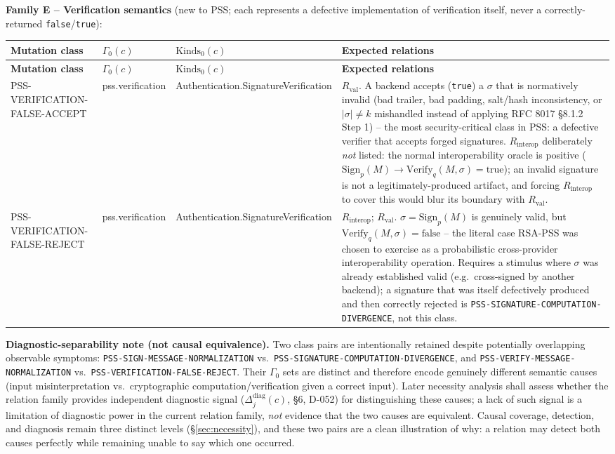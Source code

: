 \documentclass[11pt,a4paper]{article}
\begin{document}
\textbf{Family E -- Verification semantics} (new to PSS; each represents a defective implementation of verification itself, never a correctly-returned \texttt{false}/\texttt{true}):
\begin{longtable}{p{}p{}p{}p{}}
\toprule
\textbf{Mutation class} & \textbf{$\Gamma_0(c)$} & \textbf{$\text{Kinds}_0(c)$} & \textbf{Expected relations}\\
\midrule\endfirsthead
\toprule
\textbf{Mutation class} & \textbf{$\Gamma_0(c)$} & \textbf{$\text{Kinds}_0(c)$} & \textbf{Expected relations}\\
\midrule\endhead
PSS-VERIFICATION-FALSE-ACCEPT & pss.verification & Authentication.SignatureVerification & $R_{\text{val}}$. A backend accepts (\texttt{true}) a $\sigma$ that is normatively invalid (bad trailer, bad padding, salt/hash inconsistency, or $|\sigma|\neq k$ mishandled instead of applying RFC 8017 \S8.1.2 Step 1) -- the most security-critical class in PSS: a defective verifier that accepts forged signatures. $R_{\text{interop}}$ deliberately \emph{not} listed: the normal interoperability oracle is positive ($\text{Sign}_p(M) \to \text{Verify}_q(M,\sigma)=\text{true}$); an invalid signature is not a legitimately-produced artifact, and forcing $R_{\text{interop}}$ to cover this would blur its boundary with $R_{\text{val}}$.\\
PSS-VERIFICATION-FALSE-REJECT & pss.verification & Authentication.SignatureVerification & $R_{\text{interop}}$; $R_{\text{val}}$. $\sigma = \text{Sign}_p(M)$ is genuinely valid, but $\text{Verify}_q(M,\sigma) = \text{false}$ -- the literal case RSA-PSS was chosen to exercise as a probabilistic cross-provider interoperability operation. Requires a stimulus where $\sigma$ was already established valid (e.g.\ cross-signed by another backend); a signature that was itself defectively produced and then correctly rejected is \texttt{PSS-SIGNATURE-COMPUTATION-DIVERGENCE}, not this class.\\
\bottomrule
\end{longtable}

\textbf{Diagnostic-separability note (not causal equivalence).} Two class pairs are intentionally retained despite potentially overlapping observable symptoms: \texttt{PSS-SIGN-MESSAGE-NORMALIZATION} vs.\ \texttt{PSS-SIGNATURE-COMPUTATION-DIVERGENCE}, and \texttt{PSS-VERIFY-MESSAGE-NORMALIZATION} vs.\ \texttt{PSS-VERIFICATION-FALSE-REJECT}. Their $\Gamma_0$ sets are distinct and therefore encode genuinely different semantic causes (input misinterpretation vs.\ cryptographic computation/verification given a correct input). Later necessity analysis shall assess whether the relation family provides independent diagnostic signal ($\Delta_j^{\text{diag}}(c)$, \S6, D-052) for distinguishing these causes; a lack of such signal is a limitation of diagnostic power in the current relation family, \emph{not} evidence that the two causes are equivalent. Causal coverage, detection, and diagnosis remain three distinct levels (\S\ref{sec:necessity}), and these two pairs are a clean illustration of why: a relation may detect both causes perfectly while remaining unable to say which one occurred.
\end{document}
